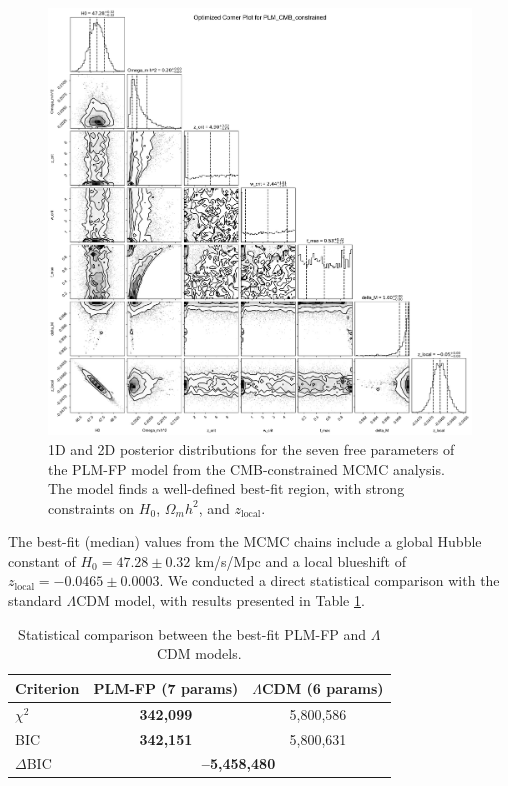\documentclass[12pt, a4paper]{article}
\begin{document}
\begin{figure}[H]
    \centering
    \includegraphics[width=\textwidth]{PLM_CMB_constrained_optimized_corner_plot.png}
    \caption{1D and 2D posterior distributions for the seven free parameters of the PLM-FP model from the CMB-constrained MCMC analysis. The model finds a well-defined best-fit region, with strong constraints on $H_0$, $\Omega_m h^2$, and $z_{\text{local}}$.}
    \label{fig:corner_plot}
\end{figure}

The best-fit (median) values from the MCMC chains include a global Hubble constant of $H_0 = 47.28 \pm 0.32$ km/s/Mpc and a local blueshift of $z_{\text{local}} = -0.0465 \pm 0.0003$. We conducted a direct statistical comparison with the standard $\Lambda$CDM model, with results presented in Table \ref{tab:comparison}.

\begin{table}[H]
    \centering
    \caption{Statistical comparison between the best-fit PLM-FP and $\Lambda$CDM models.}
    \begin{tabular}{lcc}
        \toprule
        \textbf{Criterion} & \textbf{PLM-FP (7 params)} & \textbf{$\Lambda$CDM (6 params)} \\
        \midrule
        $\chi^2$ & \textbf{342,099} & 5,800,586 \\
        BIC & \textbf{342,151} & 5,800,631 \\
        $\Delta$BIC & \multicolumn{2}{c}{\textbf{--5,458,480}} \\
        \bottomrule
    \end{tabular}
    \label{tab:comparison}
\end{table}
\end{document}
